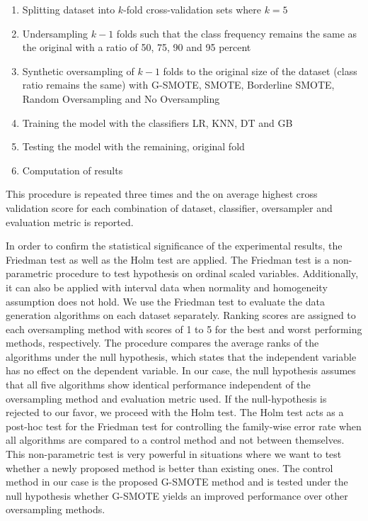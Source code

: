 \documentclass[parskip=full]{scrartcl}
\begin{document}
\begin{enumerate}
	\item 
	Splitting dataset into $\mathit{k}$-fold cross-validation sets where 
	$\mathit{k = 5}$
	\item 
	Undersampling $\mathit{k - 1}$ folds such that the class frequency remains 
	the same as the original with a ratio of 50, 75, 90 and 95 percent
	\item 
	Synthetic oversampling of $\mathit{k - 1}$ folds to the original size of 
	the dataset (class ratio remains the same) with G-SMOTE, SMOTE, Borderline 
	SMOTE, Random Oversampling and No Oversampling
	\item 
	Training the model with the classifiers LR, KNN, DT and GB
	\item 
	Testing the model with the remaining, original fold
	\item 
	Computation of results
\end{enumerate}	

This procedure is repeated three times and the on average highest cross 
validation score for each combination of dataset, classifier, oversampler and 
evaluation metric is reported.

In order to confirm the statistical significance of the experimental results, 
the Friedman test \cite{Sheldon.1996} as well as the Holm test 
\cite{JanezDemsar.2006} are applied. The Friedman test is a non-parametric 
procedure to test hypothesis on ordinal scaled variables. Additionally, it can 
also be applied with interval data when normality and homogeneity assumption 
does not hold. We use the Friedman test to evaluate the data generation 
algorithms on each dataset separately. Ranking scores are assigned to each 
oversampling method with scores of 1 to 5 for the best and worst performing 
methods, respectively. The procedure compares the average ranks of the 
algorithms under the null hypothesis, which states that the independent 
variable has no effect on the dependent variable. In our case, the null 
hypothesis assumes that all five algorithms show identical performance 
independent of the oversampling method and evaluation metric used. If the 
null-hypothesis is rejected to our favor, we proceed with the Holm test. The 
Holm test acts as a post-hoc test for the Friedman test for controlling the 
family-wise error rate when all algorithms are compared to a control method and 
not between themselves. This non-parametric test is very powerful in situations 
where we want to test whether a newly proposed method is better than existing 
ones. The control method in our case is the proposed G-SMOTE method and is 
tested under the null hypothesis whether G-SMOTE yields an improved performance 
over other oversampling methods.
\end{document}
